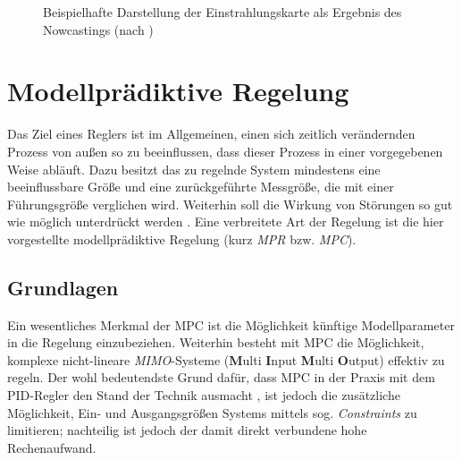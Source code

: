 \enlargethispage{\baselineskip}
\begin{figure}[h!]
    \centering
    \setlength{\fboxsep}{1pt}
    \setlength{\fboxrule}{1pt}
    \caption[Beispielhafte Darstellung der Einstrahlungskarte als Ergebnis des Nowcastings]{Beispielhafte Darstellung der Einstrahlungskarte als Ergebnis des Nowcastings (nach \cite[S.14]{Samu})}
    \label{fig_EinstrahlungNowcasting}
\end{figure}



\section{Modellprädiktive Regelung} \label{sec_ModellprädiktiveRegelung}
Das Ziel eines Reglers ist im Allgemeinen, einen sich zeitlich verändernden Prozess von außen so zu beeinflussen, dass dieser Prozess in einer vorgegebenen Weise abläuft.
Dazu besitzt das zu regelnde System mindestens eine beeinflussbare Größe und eine zurückgeführte Messgröße, die mit einer Führungsgröße verglichen wird.
Weiterhin soll die Wirkung von Störungen so gut wie möglich unterdrückt werden \cite[S.1ff]{Lunze}.
Eine verbreitete Art der Regelung ist die hier vorgestellte modellprädiktive Regelung (kurz \textit{MPR} bzw. \textit{MPC}).

\subsection{Grundlagen} \label{subsec_GrundlagenMPC}
Ein wesentliches Merkmal der MPC ist die Möglichkeit künftige Modellparameter in die Regelung einzubeziehen.
Weiterhin besteht mit MPC die Möglichkeit, komplexe nicht-lineare \mbox{\textit{MIMO}-Systeme} (\textbf{M}ulti \textbf{I}nput \textbf{M}ulti \textbf{O}utput) effektiv zu regeln.
Der wohl bedeutendste Grund dafür, dass MPC in der Praxis mit dem PID-Regler den Stand der Technik ausmacht \cite[S.viii]{Kouvaritakis}, ist jedoch die zusätzliche Möglichkeit, Ein- und Ausgangsgrößen Systems mittels sog. \textit{Constraints} zu limitieren; nachteilig ist jedoch der damit direkt verbundene hohe Rechenaufwand. \cite[S.1-2]{Kouvaritakis}

